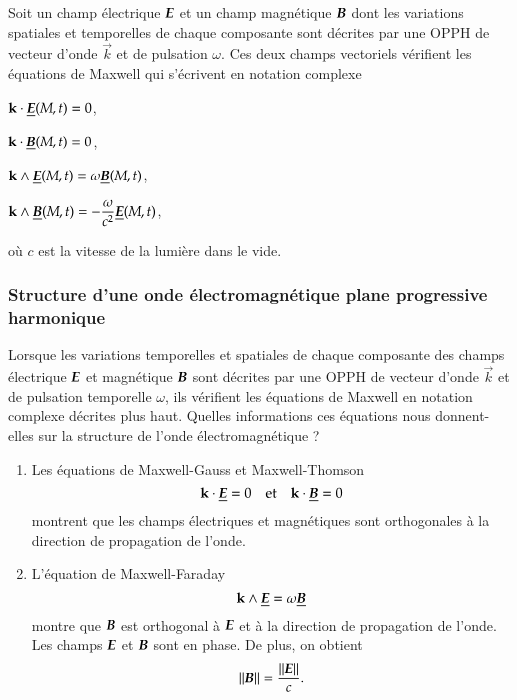 \begin{defn}
Soit un champ électrique $\vece$ et un champ magnétique $\vecb$
dont les variations spatiales et temporelles de chaque composante sont décrites 
par une OPPH de vecteur d'onde $\vec{k}$ et de pulsation $\omega$. Ces deux champs 
vectoriels vérifient les équations de Maxwell qui s'écrivent en notation complexe

\begin{description}[labelindent=2em, itemsep=1em]
	\item[Maxwell-Gauss: ]
		$\vec{k} \cdot \complex{\vece}(M, t) = 0$,
	\item[Maxwell-Thomson: ] $\vec{k} \cdot \complex{\vecb}(M, t) = 0$,
	\item[Maxwell-Faraday: ]
		$\vec{k} \wedge \complex{\vece}(M, t) = \omega \complex{\vecb}(M, t)$,
	\item[Maxwell-Ampère: ]
		$\vec{k} \wedge \complex{\vecb}(M, t) = - \dfrac{\omega}{c^2}
		\complex{\vece}(M, t)$,
\end{description}
où $c$ est la vitesse de la lumière dans le vide.
\end{defn}


\subsubsection{Structure d'une onde électromagnétique plane progressive harmonique}
Lorsque les variations temporelles et spatiales de chaque composante des 
champs électrique $\vece$ et magnétique $\vecb$ sont décrites par une OPPH de
vecteur d'onde $\vec{k}$ et de pulsation temporelle $\omega$, ils vérifient les 
équations de Maxwell en notation complexe décrites plus haut. Quelles informations
ces équations nous donnent-elles sur la structure de l'onde électromagnétique ?

\begin{enumerate}
	\item Les équations de Maxwell-Gauss et Maxwell-Thomson
\begin{equation*}
	\vec{k} \cdot \complex{\vece} = 0 \quad \mathrm{et} \quad 
	\vec{k} \cdot \complex{\vecb} = 0
\end{equation*}
montrent que les champs électriques et magnétiques sont orthogonales à la direction
de propagation de l'onde.
	\item L'équation de Maxwell-Faraday 
	\begin{equation*}
		\vec{k} \wedge \complex{\vece} = \omega \complex{\vecb}
	\end{equation*}
	montre que $\vecb$ est orthogonal à $\vece$ et à la direction de propagation 
	de l'onde. Les champs $\vece$ et $\vecb$ sont en phase. De plus, on obtient
	\begin{equation*}
		||\vecb|| = \dfrac{||\vece||}{c}.
	\end{equation*}
\end{enumerate}


